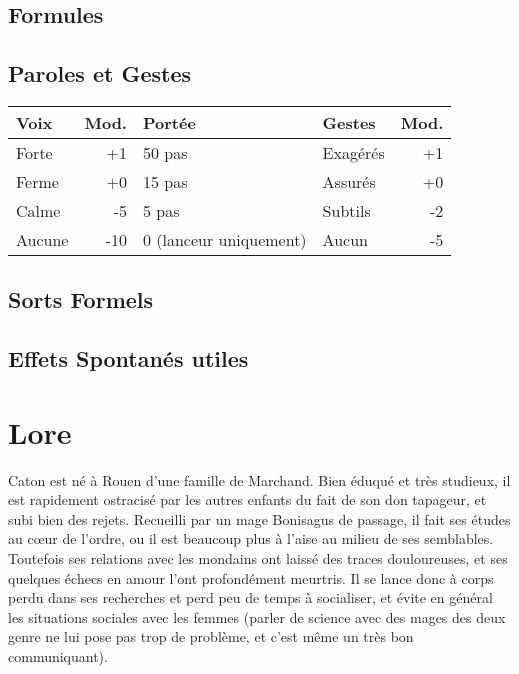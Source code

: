 \magusArtsLong

\subsection*{Formules}
\begin{multicols}{2}
\castingformulas

\begin{small}
\end{small}

\end{multicols}
\subsection*{Paroles et Gestes}
\begin{tabularx}{\textwidth}{|X|r|l||X|r|}
\hline
Voix   & Mod. & Portée                          & Gestes   & Mod. \\ \hline
Forte  &  +1  & 50 pas                          & Exagérés & +1 \\
Ferme  &  +0  & 15 pas                          & Assurés  & +0 \\
Calme  &  -5  & 5 pas                           & Subtils  & -2 \\
Aucune & -10  & 0 {\small (lanceur uniquement)} & Aucun    & -5 \\ \hline
\end{tabularx}
\pagebreak
\subsection*{Sorts Formels}
\begin{multicols}{2}
\longspells
\end{multicols}
\subsection*{Effets Spontanés utiles}

\begin{multicols}{2}

\end{multicols}

\pagebreak

\section*{Lore}
Caton est né à Rouen d'une famille de Marchand. Bien éduqué et très studieux, il est rapidement ostracisé par les autres enfants du fait de son don tapageur, et subi bien des rejets. Recueilli par un mage Bonisagus de passage, il fait ses études au cœur de l'ordre, ou il est beaucoup plus à l'aise au milieu de ses semblables. Toutefois ses relations avec les mondains ont laissé des traces douloureuses, et ses quelques échecs en amour l'ont profondément meurtris. Il se lance donc à corps perdu dans ses recherches et perd peu de temps à socialiser, et évite en général les situations sociales avec les femmes (parler de science avec des mages des deux genre ne lui pose pas trop de problème, et c'est même un très bon communiquant).

